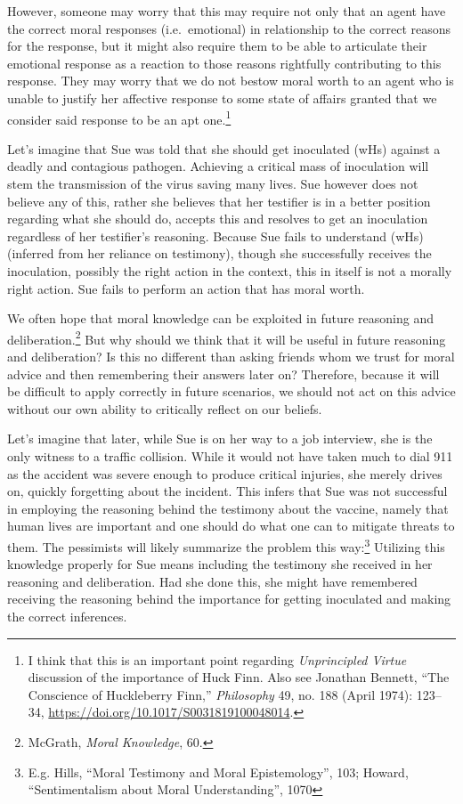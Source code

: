 \documentclass[phdthesis,12pt,final,a4paper]{wuthesis}
\theoremstyle{definition}
\theoremstyle{definition}
\theoremstyle{definition}
\theoremstyle{definition}
\theoremstyle{remark}
\begin{document}
However, someone may worry that this may require not only that an agent have the correct moral responses (i.e.~emotional) in relationship to the correct reasons for the response, but it might also require them to be able to articulate their emotional response as a reaction to those reasons rightfully contributing to this response. They may worry that we do not bestow moral worth to an agent who is unable to justify her affective response to some state of affairs granted that we consider said response to be an apt one.\footnote{I think that this is an important point regarding \emph{Unprincipled {Virtue}} discussion of the importance of Huck Finn. Also see Jonathan Bennett, {``The {Conscience} of {Huckleberry Finn},''} \emph{Philosophy} 49, no. 188 (April 1974): 123--34, \url{https://doi.org/10.1017/S0031819100048014}.}

Let's imagine that Sue was told that she should get inoculated (wHs) against a deadly and contagious pathogen. Achieving a critical mass of inoculation will stem the transmission of the virus saving many lives. Sue however does not believe any of this, rather she believes that her testifier is in a better position regarding what she should do, accepts this and resolves to get an inoculation regardless of her testifier's reasoning. Because Sue fails to understand (wHs) (inferred from her reliance on testimony), though she successfully receives the inoculation, possibly the right action in the context, this in itself is not a morally right action. Sue fails to perform an action that has moral worth.

We often hope that moral knowledge can be exploited in future reasoning and deliberation.\footnote{McGrath, \emph{Moral {Knowledge}}, 60.} But why should we think that it will be useful in future reasoning and deliberation? Is this no different than asking friends whom we trust for moral advice and then remembering their answers later on? Therefore, because it will be difficult to apply correctly in future scenarios, we should not act on this advice without our own ability to critically reflect on our beliefs.

Let's imagine that later, while Sue is on her way to a job interview, she is the only witness to a traffic collision. While it would not have taken much to dial 911 as the accident was severe enough to produce critical injuries, she merely drives on, quickly forgetting about the incident. This infers that Sue was not successful in employing the reasoning behind the testimony about the vaccine, namely that human lives are important and one should do what one can to mitigate threats to them. The pessimists will likely summarize the problem this way:\footnote{E.g. Hills, {``Moral Testimony and Moral Epistemology''}, 103; Howard, {``Sentimentalism about {Moral Understanding}''}, 1070} Utilizing this knowledge properly for Sue means including the testimony she received in her reasoning and deliberation. Had she done this, she might have remembered receiving the reasoning behind the importance for getting inoculated and making the correct inferences.
\end{document}
